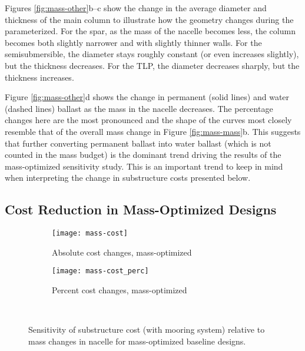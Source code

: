 Figures \ref{fig:mass-other}b--c show the change in the average diameter
and thickness of the main column to illustrate how the geometry changes
during the parameterized.  For the spar, as the mass of the nacelle
becomes less, the column becomes both slightly narrower and with
slightly thinner walls.  For the semisubmersible, the diameter stays
roughly constant (or even increases slightly), but the thickness
decreases.  For the TLP, the diameter decreases sharply, but the
thickness increases.

Figure \ref{fig:mass-other}d shows the change in permanent (solid lines)
and water (dashed lines) ballast as the mass in the nacelle decreases.
The percentage changes here are the most pronounced and the shape of the
curves most closely resemble that of the overall mass change in Figure
\ref{fig:mass-mass}b.  This suggests that further converting permanent
ballast into water ballast (which is not counted in the mass budget) is
the dominant trend driving the results of the mass-optimized sensitivity
study.  This is an important trend to keep in mind when interpreting the
change in substructure costs presented below.


\subsection{Cost Reduction in Mass-Optimized Designs}

\begin{figure}[htbp]
  \begin{subfigure}[b]{0.49\linewidth}
    \centering \texttt{[image: mass-cost]}
    \caption{Absolute cost changes, mass-optimized}
  \end{subfigure}
  \begin{subfigure}[b]{0.49\linewidth}
    \centering \texttt{[image: mass-cost\_perc]}
    \caption{Percent cost changes, mass-optimized}
  \end{subfigure}\\
  \caption{Sensitivity of substructure cost (with mooring system)
    relative to mass changes in nacelle for mass-optimized baseline designs.}
  \label{fig:mass-cost}
\end{figure}

